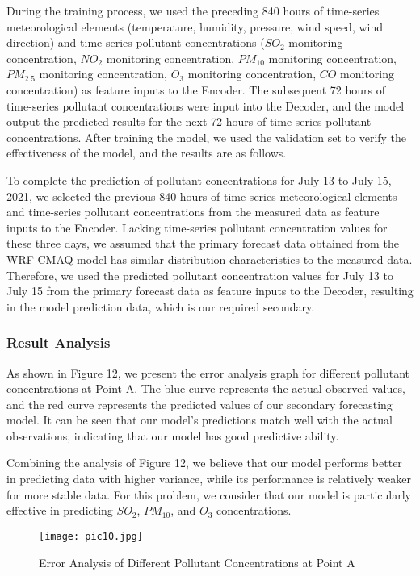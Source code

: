 \documentclass[12pt]{article}
\begin{document}
During the training process, we used the preceding 840 hours of time-series meteorological elements (temperature, humidity, pressure, wind speed, wind direction) and time-series pollutant concentrations ($SO_2$ monitoring concentration, $NO_2$ monitoring concentration, $PM_{10}$ monitoring concentration, $PM_{2.5}$ monitoring concentration, $O_3$ monitoring concentration, $CO$ monitoring concentration) as feature inputs to the Encoder. The subsequent 72 hours of time-series pollutant concentrations were input into the Decoder, and the model output the predicted results for the next 72 hours of time-series pollutant concentrations. After training the model, we used the validation set to verify the effectiveness of the model, and the results are as follows.

To complete the prediction of pollutant concentrations for July 13 to July 15, 2021, we selected the previous 840 hours of time-series meteorological elements and time-series pollutant concentrations from the measured data as feature inputs to the Encoder. Lacking time-series pollutant concentration values for these three days, we assumed that the primary forecast data obtained from the WRF-CMAQ model has similar distribution characteristics to the measured data. Therefore, we used the predicted pollutant concentration values for July 13 to July 15 from the primary forecast data as feature inputs to the Decoder, resulting in the model prediction data, which is our required secondary.

\subsubsection{Result Analysis}
As shown in Figure 12, we present the error analysis graph for different pollutant concentrations at Point A. The blue curve represents the actual observed values, and the red curve represents the predicted values of our secondary forecasting model. It can be seen that our model's predictions match well with the actual observations, indicating that our model has good predictive ability.

Combining the analysis of Figure 12, we believe that our model performs better in predicting data with higher variance, while its performance is relatively weaker for more stable data. For this problem, we consider that our model is particularly effective in predicting $SO_2$, $PM_{10}$, and $O_3$ concentrations.

\begin{figure}[H]
	\caption{Error Analysis of Different Pollutant Concentrations at Point A}
	\label{pic10}
	\centering
	\texttt{[image: pic10.jpg]}
\end{figure}
\end{document}
